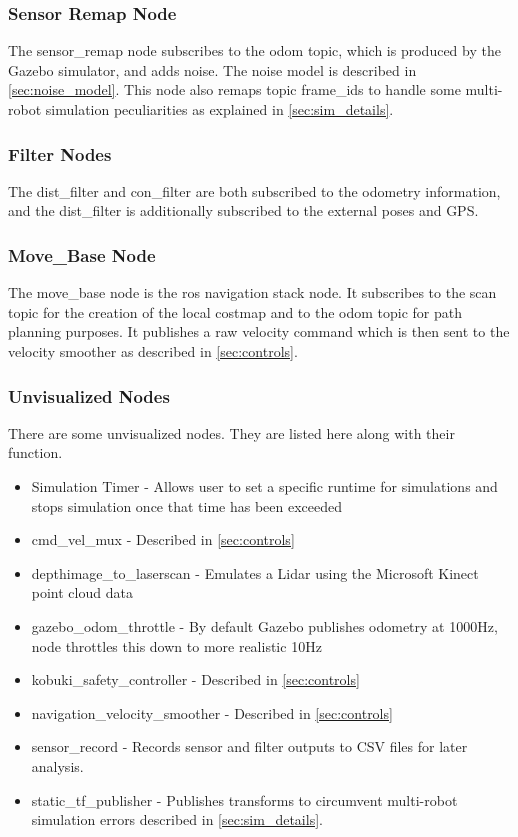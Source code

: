 \documentclass[thesis.tex]{subfile}
\begin{document}
\subsubsection{Sensor Remap Node}
The sensor\_remap node subscribes to the odom topic, which is produced by the Gazebo simulator, and adds noise. The noise model is described in \autoref{sec:noise_model}. This node also remaps topic frame\_ids to handle some multi-robot simulation peculiarities as explained in \autoref{sec:sim_details}.

\subsubsection{Filter Nodes}
The \gls{dist_filter} and \gls{con_filter} are both subscribed to the odometry information, and the \gls{dist_filter} is additionally subscribed to the external poses and GPS.

\subsubsection{Move\_Base Node}
The move\_base node is the \gls{ros} navigation stack node. It subscribes to the scan topic for the creation of the local costmap and to the odom topic for path planning purposes. It publishes a raw velocity command which is then sent to the velocity smoother as described in \autoref{sec:controls}.

\subsubsection{Unvisualized Nodes}
There are some unvisualized nodes. They are listed here along with their function.
\begin{itemize}
\item Simulation Timer - Allows user to set a specific runtime for simulations and stops simulation once that time has been exceeded
\item cmd\_vel\_mux - Described in \autoref{sec:controls}
\item depthimage\_to\_laserscan - Emulates a Lidar using the Microsoft Kinect point cloud data \cite{Rockey2016}
\item gazebo\_odom\_throttle - By default Gazebo publishes odometry at 1000Hz, node throttles this down to more realistic 10Hz
\item kobuki\_safety\_controller - Described in \autoref{sec:controls}
\item navigation\_velocity\_smoother - Described in \autoref{sec:controls}
\item sensor\_record - Records sensor and filter outputs to \gls{CSV} files for later analysis.
\item static\_tf\_publisher - Publishes transforms to circumvent multi-robot simulation errors described in \autoref{sec:sim_details}.
\end{itemize}
\end{document}
